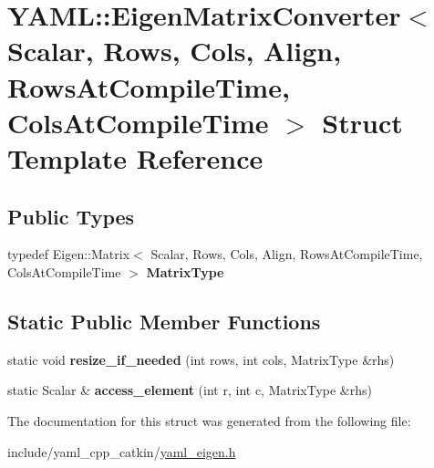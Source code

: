\hypertarget{structYAML_1_1EigenMatrixConverter}{}\section{Y\+A\+ML\+:\+:Eigen\+Matrix\+Converter$<$ Scalar, Rows, Cols, Align, Rows\+At\+Compile\+Time, Cols\+At\+Compile\+Time $>$ Struct Template Reference}
\label{structYAML_1_1EigenMatrixConverter}
\subsection*{Public Types}
\begin{DoxyCompactItemize}
\item 
\mbox{\label{structYAML_1_1EigenMatrixConverter_a46c2e1524d0287ef8e0bbfad07f4111a}} 
typedef Eigen\+::\+Matrix$<$ Scalar, Rows, Cols, Align, Rows\+At\+Compile\+Time, Cols\+At\+Compile\+Time $>$ {\bfseries Matrix\+Type}
\end{DoxyCompactItemize}
\subsection*{Static Public Member Functions}
\begin{DoxyCompactItemize}
\item 
\mbox{\label{structYAML_1_1EigenMatrixConverter_a61d62ab23d2ff9fe961f052e18da4998}} 
static void {\bfseries resize\+\_\+if\+\_\+needed} (int rows, int cols, Matrix\+Type \&rhs)
\item 
\mbox{\label{structYAML_1_1EigenMatrixConverter_ad9f58bba84fc000b6aecd10142ecc16e}} 
static Scalar \& {\bfseries access\+\_\+element} (int r, int c, Matrix\+Type \&rhs)
\end{DoxyCompactItemize}


The documentation for this struct was generated from the following file\+:\begin{DoxyCompactItemize}
\item 
include/yaml\+\_\+cpp\+\_\+catkin/\hyperlink{yaml__eigen_8h}{yaml\+\_\+eigen.\+h}\end{DoxyCompactItemize}
